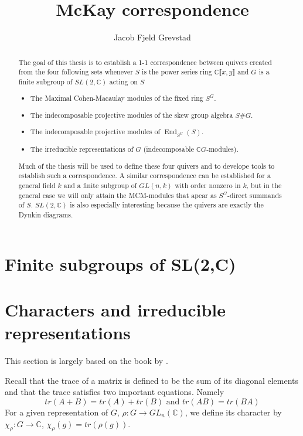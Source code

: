\documentclass[11pt, a4paper, english]{article}
\numberwithin{prop}{section}
\numberwithin{lemma}{section}
\numberwithin{theorem}{section}
\numberwithin{defin}{section}
\numberwithin{example}{section}
\newcommand{\C}{\mathbb{C}}
\DeclareMathOperator{\End}{End}
\begin{document}
\title{McKay correspondence}
\author{Jacob Fjeld Grevstad}
\maketitle

\begin{abstract}
The goal of this thesis is to establish a 1-1 correspondence between quivers created from the four following sets whenever $S$ is the power series ring $\C \llbracket x, y \rrbracket$ and $G$ is a finite subgroup of $SL(2,\C)$ acting on $S$
\begin{itemize}
\item The Maximal Cohen-Macaulay modules of the fixed ring $S^G$.
\item The indecomposable projective modules of the skew group algebra $S\#G$.
\item The indecomposable projective modules of $\End_{S^G}(S)$.
\item The irreducible representations of $G$ (indecomposable $\C G$-modules).
\end{itemize}
Much of the thesis will be used to define these four quivers and to develope tools to establish such a correspondence. A similar correspondence can be established for a general field $k$ and a finite subgroup of $GL(n, k)$ with order nonzero in $k$, but in the general case we will only attain the MCM-modules that apear as $S^G$-direct summands of $S$. $SL(2, \C)$ is also especially interesting because the quivers are exactly the Dynkin diagrams.
\end{abstract}

\tableofcontents

\section{Finite subgroups of SL(2,C)}

\section{Characters and irreducible representations}
This section is largely based on the book by \cite{RCG}.

Recall that the trace of a matrix is defined to be the sum of its diagonal elements and that the trace satisfies two important equations. Namely
$$tr(A+B)=tr(A)+tr(B) \text{  and  } tr(AB)=tr(BA)$$
For a given representation of $G$, $\rho: G \to GL_n(\mathbb{C})$, we define its character by $\chi_\rho : G \to \mathbb{C}$, $\chi_\rho(g) = tr(\rho(g))$.
\end{document}
